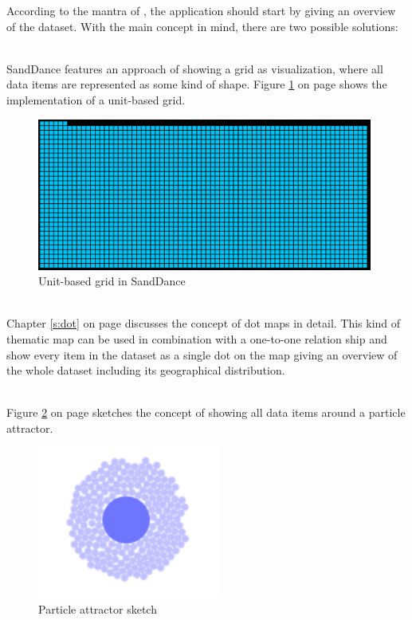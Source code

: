 According to the mantra of \citeauthor{Shneiderman1996}, the application should start by giving an overview of the dataset. With the main concept in mind, there are two possible solutions:
\begin{enumerate}

 \hfill \\
SandDance features an approach of showing a grid as visualization, where all data items are represented as some kind of shape. Figure \ref{fig:sanddance-grid} on page \pageref{fig:sanddance-grid} shows the implementation of a unit-based grid.

\begin{figure}[!htb]
\centering
\includegraphics[height=5cm]{images/methods/related/sanddance-grid.png}
\caption[
    Unit-based grid in SandDance.
]{Unit-based grid in SandDance}
\label{fig:sanddance-grid}
\end{figure}

 \hfill \\
Chapter \ref{s:dot} on page \pageref{s:dot} discusses the concept of dot maps in detail. This kind of thematic map can be used in combination with a one-to-one relation ship and show every item in the dataset as a single dot on the map giving an overview of the whole dataset including its geographical distribution.

 \hfill \\
Figure \ref{fig:particle-attractor} on page \pageref{fig:particle-attractor} sketches the concept of showing all data items around a particle attractor.

\begin{figure}[!htb]
\centering
\includegraphics[height=5cm]{images/methods/related/particle-attractor.png}
\caption[
    Particle attractor sketch.
]{Particle attractor sketch}
\label{fig:particle-attractor}
\end{figure}

\end{enumerate}

